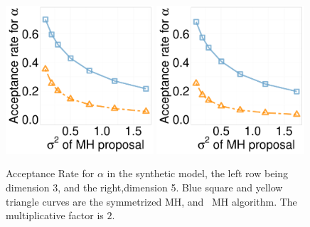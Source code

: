   \begin{figure}[H]
  \centering
  \begin{minipage}[!hp]{0.49\linewidth}
    \includegraphics [width=0.49\textwidth, angle=0]{figs/acc/EXP_D3alpha_k2.pdf}
    \includegraphics [width=0.49\textwidth, angle=0]{figs/acc/EXP_D5alpha_k2.pdf}
  \end{minipage}
  \begin{minipage}[!hp]{0.49\linewidth}
    \caption{Acceptance Rate for $\alpha$ in the synthetic model, the left row being dimension 3, and the right,dimension 5. Blue square and yellow triangle curves are the symmetrized MH,
 and \naive\ MH  algorithm. The multiplicative factor is $2$. }
     \label{fig:ACC_EXP}
  \end{minipage}
  \end{figure}


  
